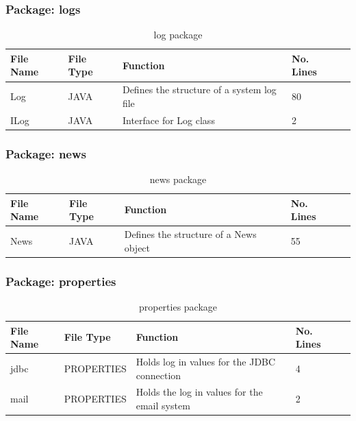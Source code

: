\subsubsection{Package: logs}
\begin{table}[H]
\begin{center}
    \begin{tabular}{| l | l | l| l |p{1cm} |}
    \hline
    File Name & File Type & Function & No. Lines\\ \hline
    Log & JAVA & Defines the structure of a system log file & 80\\ \hline
	ILog & JAVA & Interface for Log class & 2\\ \hline
    \end{tabular}
\end{center}
\caption{log package}
\end{table}

\subsubsection{Package: news}
\begin{table}[H]
\begin{center}
     \begin{tabular}{| l | l | l| l |p{1cm} |}
    \hline
    File Name & File Type & Function & No. Lines\\ \hline
    News & JAVA & Defines the structure of a News object & 55\\ \hline
    \end{tabular}
\end{center}
\caption{news package}
\end{table}

\subsubsection{Package: properties}
\begin{table}[H]
\begin{center}
     \begin{tabular}{| l | l | l| l |p{1cm} |}
    \hline
    File Name & File Type & Function & No. Lines\\ \hline
    jdbc & PROPERTIES & Holds log in values for the JDBC connection & 4\\ \hline
	mail & PROPERTIES & Holds the log in values for the email system & 2\\ \hline
    \end{tabular}
\end{center}
\caption{properties package}
\end{table}

